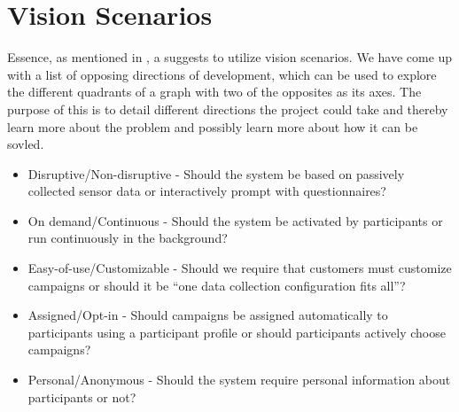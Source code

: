 \section{Vision Scenarios}
\label{sec:vision_scenarios}
Essence, as mentioned in , a suggests to utilize vision scenarios. We have come up with a list of opposing directions of development, which can be used to explore the different quadrants of a graph with two of the opposites as its axes. The purpose of this is to detail different directions the project could take and thereby learn more about the problem and possibly learn more about how it can be sovled. 


\begin{itemize}[itemsep=0.1em]
    \item Disruptive/Non-disruptive - Should the system be based on passively collected sensor data or interactively prompt with questionnaires? %
    \item On demand/Continuous - Should the system be activated by participants or run continuously in the background? %
    \item Easy-of-use/Customizable - Should we require that customers must customize campaigns or should it be ``one data collection configuration fits all''? %
    \item Assigned/Opt-in - Should campaigns be assigned automatically to participants using a participant profile or should participants actively choose campaigns? %
    \item Personal/Anonymous - Should the system require personal information about participants or not? %
\end{itemize}

